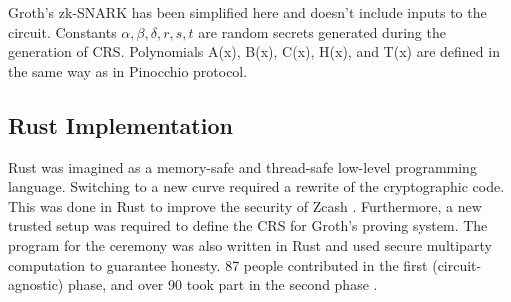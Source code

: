 \noindent Groth's zk-SNARK has been simplified here and doesn't include inputs to the circuit. Constants $\alpha, \beta, \delta, r, s, t$ are random secrets generated during the generation of CRS. Polynomials A(x), B(x), C(x), H(x), and T(x) are defined in the same way as in Pinocchio \cite{parno2013pinocchio} protocol.

\subsection{Rust Implementation}
\label{section:rust}
Rust \cite{rustlang} was imagined as a memory-safe and thread-safe low-level programming language. Switching to a new curve required a rewrite of the cryptographic code. This was done in Rust to improve the security of Zcash \cite{zcashbellman}. Furthermore, a new trusted setup was required to define the CRS for Groth's proving system. The program for the ceremony was also written in Rust and used secure multiparty computation to guarantee honesty. 87 people contributed in the first (circuit-agnostic) phase, and over 90 took part in the second phase \cite{zcashparamgen}.